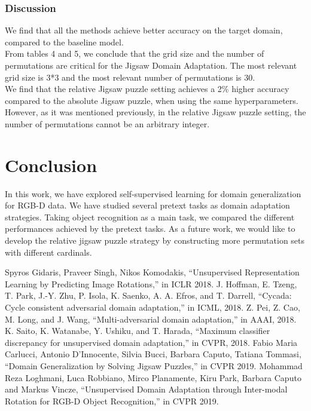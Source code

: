 \documentclass[conference]{IEEEtran}
\begin{document}
\subsubsection{Discussion}
We find that all the methods achieve better accuracy on the target domain, compared to the baseline model.
\\
From tables 4 and 5, we conclude that the grid size and the number of permutations are critical for the Jigsaw Domain Adaptation. The most relevant grid size is 3*3 and the most relevant number of permutations is 30. 
\\
We find that the relative Jigsaw puzzle setting achieves a  2\% higher accuracy compared to the absolute Jigsaw puzzle, when using the same hyperparameters.
However, as it was mentioned previously, in the relative Jigsaw puzzle setting, the number of permutations cannot be an arbitrary integer. 
\section{Conclusion}
In this work, we have explored self-supervised learning for domain generalization for RGB-D data. We have studied several pretext tasks as domain adaptation strategies. Taking object recognition as a main task, we compared the different performances achieved by the pretext tasks. As a future work, we would like to develop the relative jigsaw puzzle strategy by constructing more permutation sets with different cardinals.




\begin{thebibliography}{00}
 Spyros Gidaris, Praveer Singh, Nikos Komodakis, ``Unsupervised Representation Learning by Predicting Image Rotations,'' in ICLR 2018.
 J. Hoffman, E. Tzeng, T. Park, J.-Y. Zhu, P. Isola, K. Saenko, A. A. Efros, and T. Darrell, “Cycada: Cycle consistent adversarial domain adaptation,” in ICML, 2018.
 Z. Pei, Z. Cao, M. Long, and J. Wang, “Multi-adversarial domain adaptation,” in AAAI, 2018.
 K. Saito, K. Watanabe, Y. Ushiku, and T. Harada, “Maximum classifier discrepancy for unsupervised domain adaptation,” in CVPR, 2018.
 Fabio Maria Carlucci, Antonio D'Innocente, Silvia Bucci, Barbara Caputo, Tatiana Tommasi, ``Domain Generalization by Solving Jigsaw Puzzles,'' in CVPR 2019.
 Mohammad Reza Loghmani, Luca Robbiano, Mirco Planamente, Kiru Park, Barbara Caputo and Markus Vincze, ``Unsupervised Domain Adaptation through Inter-modal Rotation for RGB-D Object Recognition,'' in CVPR 2019.
\end{thebibliography}
\end{document}
